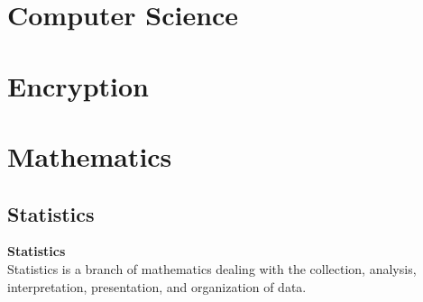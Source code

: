 \documentclass[12pt]{report}
\begin{document}
\setlength{\parskip}{1.5em}   %
\setlength\parindent{0pt}   %


\chapter{Computer Science}

















\chapter{Encryption}









\chapter{Mathematics}



\section{Statistics}
\textbf{Statistics} \\
Statistics is a branch of mathematics dealing with the collection, analysis, interpretation, presentation, and organization of data.


\end{document}
